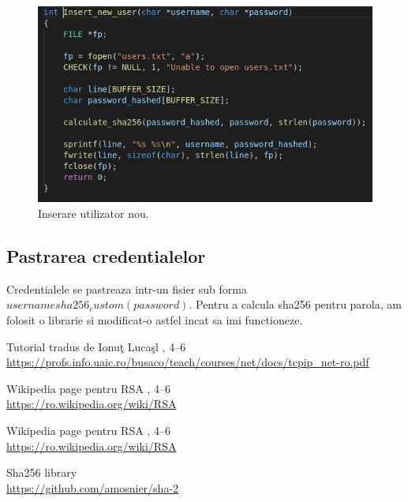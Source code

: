 \documentclass[runningheads]{llncs}
\begin{document}
\begin{figure}[H]
  \includegraphics[width=\linewidth]{lognew.png}
  \caption{Inserare utilizator nou.}
  \label{fig:lognew}
\end{figure}

\subsection { Pastrarea credentialelor}
Credentialele se pastreaza intr-un fisier sub forma $username sha256_custom(password)$. 
Pentru a calcula sha256 pentru parola, am folosit o librarie si modificat-o astfel incat sa imi functioneze. \cite{ref_sha256}

%

%
\begin{thebibliography}{9}

Tutorial tradus de Ionuţ Lucaşl , 4--6 \\
\url{https://profs.info.uaic.ro/busaco/teach/courses/net/docs/tcpip\_net-ro.pdf}


Wikipedia page pentru RSA , 4--6 \\
\url{https://ro.wikipedia.org/wiki/RSA}


Wikipedia page pentru RSA , 4--6 \\
\url{https://ro.wikipedia.org/wiki/RSA}


Sha256 library \\
\url{https://github.com/amosnier/sha-2}


\end{thebibliography}  
\end{document}

